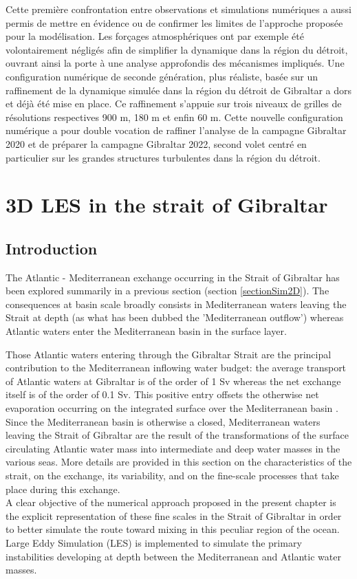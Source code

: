 Cette première confrontation entre observations et simulations numériques a aussi permis de mettre en évidence ou de confirmer les limites de l'approche proposée pour la modélisation. Les forçages atmosphériques ont par exemple été volontairement négligés afin de simplifier la dynamique dans la région du détroit, ouvrant ainsi la porte à une analyse approfondis des mécanismes impliqués. Une configuration numérique de seconde génération, plus réaliste, basée sur un raffinement de la dynamique simulée dans la région du détroit de Gibraltar a dors et déjà été mise en place. Ce raffinement s'appuie sur trois niveaux de grilles de résolutions respectives 900 m, 180 m et enfin 60 m. Cette nouvelle configuration numérique a pour double vocation de raffiner l'analyse de la campagne Gibraltar 2020 et de préparer la campagne Gibraltar 2022, second volet centré en particulier sur les grandes structures turbulentes dans la région du détroit.


\section{3D LES in the strait of Gibraltar}
\label{sectionSim3D}
\subsection{Introduction}

The Atlantic - Mediterranean exchange occurring in the Strait of Gibraltar has been explored summarily in a previous section (section \ref{sectionSim2D}). The consequences at basin scale broadly consists in Mediterranean waters leaving the Strait at depth (as what has been dubbed the 'Mediterranean outflow') whereas Atlantic waters enter the Mediterranean basin in the surface layer.

Those Atlantic waters entering through the Gibraltar Strait are the principal contribution to the Mediterranean inflowing water budget: the average transport of Atlantic waters at Gibraltar is of the order of 1 Sv whereas the net exchange itself is of the order of 0.1 Sv. This positive entry offsets the otherwise net evaporation occurring on the integrated surface over the Mediterranean basin \citep{Bryden94}.
Since the Mediterranean basin is otherwise a closed, Mediterranean waters leaving the Strait of Gibraltar are the result of the transformations of the surface circulating Atlantic water mass into intermediate and deep water masses in the various seas.
More details are provided in this section on the characteristics of the strait, on the exchange, its variability, and on the fine-scale processes that take place during this exchange.\\
A clear objective of the numerical approach proposed in the present chapter is the explicit representation of these fine scales in the Strait of Gibraltar in order to better simulate the route toward mixing in this peculiar region of the ocean. Large Eddy Simulation (LES) is implemented to simulate the primary instabilities developing at depth between the Mediterranean and Atlantic water masses.

